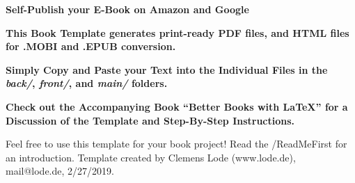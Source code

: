

\thispagestyle{empty}

	\begin{center}

  \bfseries \sffamily \Huge Self-Publish your E-Book on Amazon and Google\par
	\bfseries \LARGE This Book Template generates print-ready PDF files, and HTML files for .MOBI and .EPUB conversion.\par
    \bfseries \LARGE Simply Copy and Paste your Text into the Individual Files in the \textit{back/}, \textit{front/}, and \textit{main/} folders.\par
    \bfseries \LARGE Check out the Accompanying Book ``Better Books with LaTeX'' for a Discussion of the Template and Step-By-Step Instructions.\par
    \Large Feel free to use this template for your book project! Read the /ReadMeFirst for an introduction. Template created by Clemens Lode (www.lode.de), mail@lode.de, 2/27/2019.
	\end{center}
\newpage
